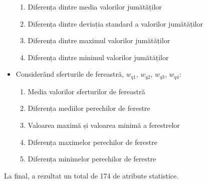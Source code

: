 \begin{itemize}
	\begin{enumerate}
		\item Diferența dintre media valorilor jumătăților
		\item Diferența dintre deviația standard a valorilor jumătăților
		\item Diferența dintre maximul valorilor jumătăților
		\item Diferența dintre minimul valorilor jumătăților
	\end{enumerate}
	\item Considerând sferturile de fereastră, $w_{q1}$, $w_{q2}$, $w_{q3}$, $w_{q4}$:
		\begin{enumerate}
		\item Media valorilor sferturilor de fereastră
		\item Diferența mediilor perechilor de ferestre
		\item Valoarea maximă și valoarea minimă a ferestrelor
		\item Diferența maximelor perechilor de ferestre
		\item Diferența minimelor perechilor de ferestre
	\end{enumerate}
\end{itemize}

La final, a rezultat un total de 174 de atribute statistice.

